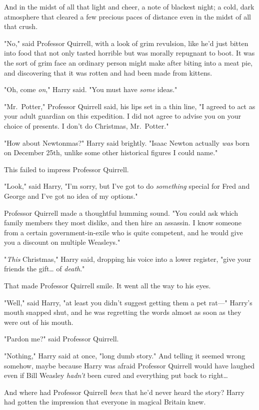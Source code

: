 And in the midst of all that light and cheer, a note of blackest night; a cold, 
dark atmosphere that cleared a few precious paces of distance even in the midst 
of all that crush.

"No," said Professor Quirrell, with a look of grim revulsion, like he'd just 
bitten into food that not only tasted horrible but was morally repugnant to 
boot. It was the sort of grim face an ordinary person might make after biting 
into a meat pie, and discovering that it was rotten and had been made from 
kittens.

"Oh, come \emph{on}," Harry said. "You must have \emph{some} ideas."

"Mr.~Potter," Professor Quirrell said, his lips set in a thin line, "I agreed 
to act as your adult guardian on this expedition. I did not agree to advise you 
on your choice of presents. I don't do Christmas, Mr.~Potter."

"How about Newtonmas?" Harry said brightly. "Isaac Newton actually \emph{was} 
born on December 25th, unlike some other historical figures I could name."

This failed to impress Professor Quirrell.

"Look," said Harry, "I'm sorry, but I've got to do \emph{something} special for 
Fred and George and I've got no idea of my options."

Professor Quirrell made a thoughtful humming sound. "You could ask which family 
members they most dislike, and then hire an assassin. I know someone from a 
certain government-in-exile who is quite competent, and he would give you a 
discount on multiple Weasleys."

"\emph{This} Christmas," Harry said, dropping his voice into a lower register, 
"give your friends the gift{\ldots} of \emph{death}."

That made Professor Quirrell smile. It went all the way to his eyes.

"Well," said Harry, "at least you didn't suggest getting them a pet rat---" 
Harry's mouth snapped shut, and he was regretting the words almost as soon as 
they were out of his mouth.

"Pardon me?" said Professor Quirrell.

"Nothing," Harry said at once, "long dumb story." And telling it seemed wrong 
somehow, maybe because Harry was afraid Professor Quirrell would have laughed 
even if Bill Weasley \emph{hadn't} been cured and everything put back to 
right{\ldots}

And where had Professor Quirrell \emph{been} that he'd never heard the story? 
Harry had gotten the impression that everyone in magical Britain knew.

